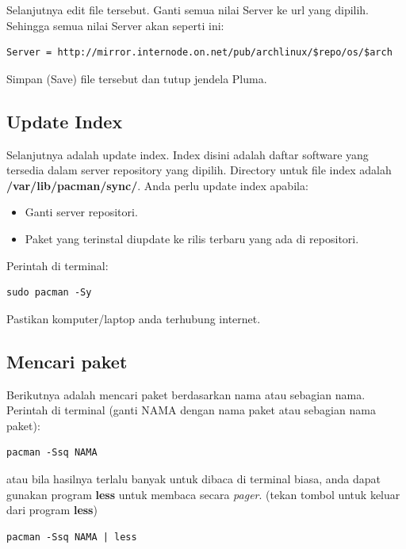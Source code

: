 \documentclass[12pt,]{article}
\begin{document}
	Selanjutnya edit file tersebut.
	Ganti semua nilai Server ke url yang dipilih.
	Sehingga semua nilai Server akan seperti ini:	
	\begin{verbatim}
Server = http://mirror.internode.on.net/pub/archlinux/$repo/os/$arch
	\end{verbatim}
	
	Simpan (Save) file tersebut dan tutup jendela Pluma.
	
	\newpage
	\subsection{Update Index}
	
	Selanjutnya adalah update index.
	Index disini adalah daftar software yang tersedia dalam server repository yang dipilih.
	Directory untuk file index adalah \textbf{/var/lib/pacman/sync/}.
	Anda perlu update index apabila:
	\begin{itemize}
		\item Ganti server repositori.
		\item Paket yang terinstal diupdate ke rilis terbaru yang ada di repositori.
	\end{itemize}

	Perintah di terminal:
	\begin{verbatim}
sudo pacman -Sy
	\end{verbatim}
	
	Pastikan komputer/laptop anda terhubung internet.
	
	\subsection{Mencari paket}
	
	Berikutnya adalah mencari paket berdasarkan nama atau sebagian nama.
	Perintah di terminal (ganti NAMA dengan nama paket atau sebagian nama paket):
	
	\begin{verbatim}
pacman -Ssq NAMA
	\end{verbatim}
	
	atau bila hasilnya terlalu banyak untuk dibaca di terminal biasa, anda dapat gunakan program \textbf{less} untuk membaca secara \textit{pager}.
	(tekan tombol  untuk keluar dari program \textbf{less})
	
	\begin{verbatim}
pacman -Ssq NAMA | less
	\end{verbatim}
	
\end{document}
